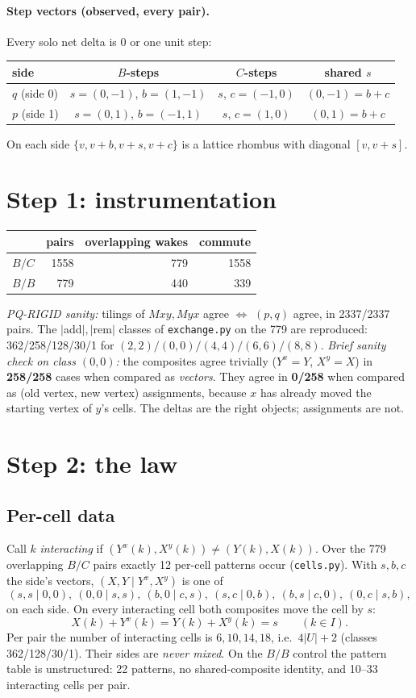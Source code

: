 \documentclass[11pt]{article}
\theoremstyle{definition}\newtheorem{definition}[theorem]{Definition}\newtheorem{remark}[theorem]{Remark}
\begin{document}
\paragraph{Step vectors (observed, every pair).} Every solo net delta is $0$ or one unit step:
\begin{center}\begin{tabular}{lccc}\toprule
side & $B$-steps & $C$-steps & shared $s$\\\midrule
$q$ (side 0) & $s=(0,-1)$, $b=(1,-1)$ & $s$, $c=(-1,0)$ & $(0,-1)=b+c$\\
$p$ (side 1) & $s=(0,1)$, $b=(-1,1)$ & $s$, $c=(1,0)$ & $(0,1)=b+c$\\\bottomrule
\end{tabular}\end{center}
On each side $\{v,v+b,v+s,v+c\}$ is a lattice rhombus with diagonal $[v,v+s]$.

\section{Step 1: instrumentation}
\begin{center}\begin{tabular}{lrrr}\toprule
& pairs & overlapping wakes & commute\\\midrule
$B/C$ & 1558 & 779 & 1558\\
$B/B$ & 779 & 440 & 339\\\bottomrule
\end{tabular}\end{center}
\emph{PQ-RIGID sanity:} tilings of $Mxy,Myx$ agree $\iff$ $(p,q)$ agree, in 2337/2337 pairs. The $|$add$|,|$rem$|$ classes of \texttt{exchange.py} on the 779 are reproduced:
362/258/128/30/1 for $(2,2)/(0,0)/(4,4)/(6,6)/(8,8)$.
\emph{Brief sanity check on class $(0,0)$:} the composites agree trivially ($Y^x=Y$, $X^y=X$) in \textbf{258/258} cases when compared as \emph{vectors}.
They agree in \textbf{0/258} when compared as (old vertex, new vertex) assignments, because $x$ has already moved the starting vertex of $y$'s cells.
The deltas are the right objects; assignments are not.

\section{Step 2: the law}
\subsection{Per-cell data}
Call $k$ \emph{interacting} if $(Y^x(k),X^y(k))\neq(Y(k),X(k))$. Over the 779 overlapping $B/C$ pairs exactly 12 per-cell patterns occur
(\texttt{cells.py}). With $s,b,c$ the side's vectors, $(X,Y\mid Y^x,X^y)$ is one of
\[(s,s\mid 0,0),\ (0,0\mid s,s),\ (b,0\mid c,s),\ (s,c\mid 0,b),\ (b,s\mid c,0),\ (0,c\mid s,b),\]
on each side. On every interacting cell both composites move the cell by $s$:
\[X(k)+Y^x(k)=Y(k)+X^y(k)=s\qquad(k\in I).\]
Per pair the number of interacting cells is $6,10,14,18$, i.e.\ $4|U|+2$ (classes 362/128/30/1). Their sides are \emph{never mixed}. On the $B/B$ control
the pattern table is unstructured: 22 patterns, no shared-composite identity, and 10--33 interacting cells per pair.
\end{document}
